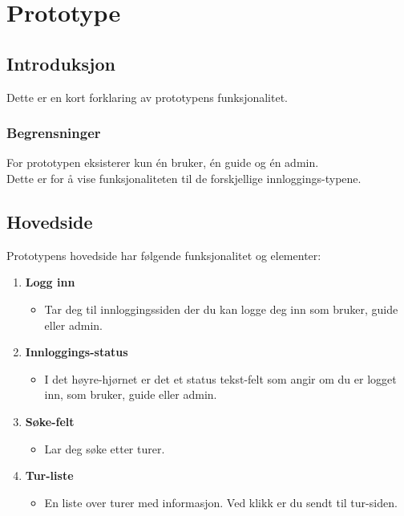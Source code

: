 \documentclass[../doc]{subfiles}
\begin{document}
\section{Prototype}
\subsection{Introduksjon}
Dette er en kort forklaring av prototypens funksjonalitet.

\subsubsection{Begrensninger}
For prototypen eksisterer kun én bruker, én guide og én admin. \\
Dette er for å vise funksjonaliteten til de forskjellige innloggings-typene. 

\subsection{Hovedside}
Prototypens hovedside har følgende funksjonalitet og elementer:

\begin{enumerate}
    \item \textbf{Logg inn}
    \begin{itemize}
        \item Tar deg til innloggingssiden der du kan logge deg inn som bruker, guide eller admin.
    \end{itemize}

    \item \textbf{Innloggings-status}
    \begin{itemize}
        \item I det høyre-hjørnet er det et status tekst-felt som angir om du er logget inn, som bruker, guide eller admin.
    \end{itemize}

    \item \textbf{Søke-felt}
    \begin{itemize}
        \item Lar deg søke etter turer.
    \end{itemize}

    \item \textbf{Tur-liste}
    \begin{itemize}
        \item En liste over turer med informasjon. Ved klikk er du sendt til tur-siden.
    \end{itemize}
\end{enumerate}
\end{document}

